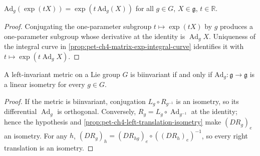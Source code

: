 \begin{proposition}
  \label{prop:pet-ch4-adjoint-exp-relation}
  \leanok
  $\mathrm{Ad}_g(\exp(tX))=\exp(t\,\mathrm{Ad}_g(X))$ for all $g\in G$, $X\in\mathfrak g$, $t\in\mathbb{R}$.
\end{proposition}
\begin{proof}
  \leanok
  \sketch
  Conjugating the one-parameter subgroup $t\mapsto\exp(tX)$ by $g$ produces a
  one-parameter subgroup whose derivative at the identity is
  $\operatorname{Ad}_gX$. Uniqueness of the integral curve in
  \cref{prop:pet-ch4-matrix-exp-integral-curve} identifies it with
  $t\mapsto\exp(t\operatorname{Ad}_gX)$.
\end{proof}

\begin{proposition}
  \label{prop:pet-ch4-biinvariant-criterion}
  A left-invariant metric on a Lie group $G$ is biinvariant if and only if
  $\mathrm{Ad}_g:\mathfrak g\to\mathfrak g$ is a linear isometry for every $g\in G$.
\end{proposition}
\begin{proof}
  \sketch
  If the metric is biinvariant, conjugation $L_g\circ R_{g^{-1}}$ is an
  isometry, so its differential $\operatorname{Ad}_g$ is orthogonal. Conversely,
  $R_g=L_g\circ\operatorname{Ad}_{g^{-1}}$ at the identity; hence the hypothesis
  and \cref{prop:pet-ch4-left-translation-isometry} make $(DR_g)_e$ an
  isometry. For any $h$,
  $(DR_g)_h=(DR_{hg})_e\circ((DR_h)_e)^{-1}$, so every right translation is an
  isometry.
\end{proof}


